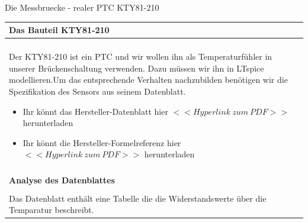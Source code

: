 \begin{frame}[t]{Die Messbruecke - realer PTC KTY81-210} 
    
    \begin{spacing}{0.9} \begin{tiny}
      \begin{table}[h!]
      \begin{tabular}{p{10cm}}
        \hline
        \textbf{Das Bauteil KTY81-210} \\
        \hline \\
        \begin{minipage}{\textwidth}
            Der KTY81-210 ist ein PTC und wir wollen ihn als Temperaturfühler in unserer Brückenschaltung verwenden.\newline
            Dazu müssen wir ihn in LTspice modellieren.\newline\newline Um das entsprechende Verhalten nachzubilden benötigen wir die 
            Spezifikation des Sensors aus seinem Datenblatt.
            \begin{itemize}
                \item Ihr könnt das Hersteller-Datenblatt hier \href{https://cdn-reichelt.de/documents/datenblatt/B400/KTY81-2\%23PHI.pdf}{ $ << Hyperlink\ zum\ PDF >> $} herunterladen
                \item Ihr könnt die Hersteller-Formelreferenz hier \href{https://www.mikrocontroller.net/attachment/243481/KTY-Philips.pdf}{$ << Hyperlink\ zum\ PDF >> $} herunterladen
            \end{itemize}
            

        \end{minipage} 
        \\ \\
        \hline
        \textbf{Analyse des Datenblattes} \\
        \hline \\
        \begin{minipage}{\textwidth}
            Das Datenblatt enthält eine Tabelle die die Widerstandswerte über die Temparatur beschreibt. \newline


\end{minipage}
\end{tabular}
\end{table}
\end{tiny}
\end{spacing}
\end{frame}
